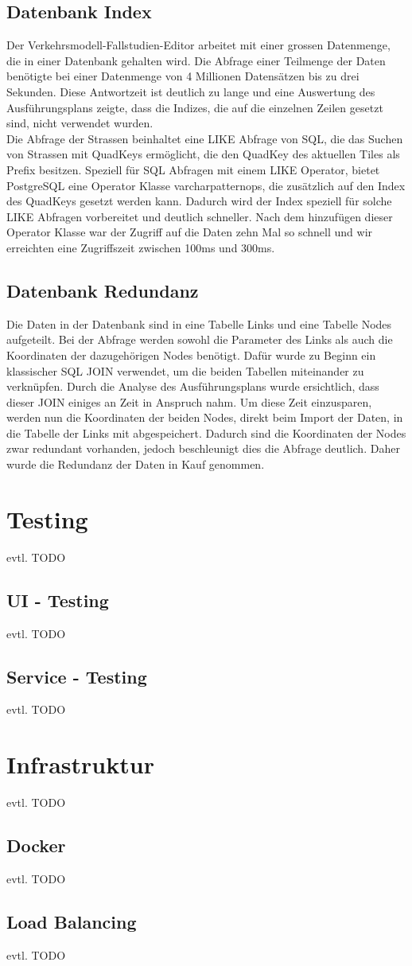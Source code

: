 \subsection{Datenbank Index}
Der Verkehrsmodell-Fallstudien-Editor arbeitet mit einer grossen Datenmenge, die in einer Datenbank gehalten wird. Die Abfrage einer Teilmenge der Daten benötigte bei einer Datenmenge von 4 Millionen Datensätzen bis zu drei Sekunden. Diese Antwortzeit ist deutlich zu lange und eine Auswertung des Ausführungsplans zeigte, dass die Indizes, die auf die einzelnen Zeilen gesetzt sind, nicht verwendet wurden.\\
Die Abfrage der Strassen beinhaltet eine LIKE Abfrage von SQL, die das Suchen von Strassen mit QuadKeys ermöglicht, die den QuadKey des aktuellen Tiles als Prefix besitzen. Speziell für SQL Abfragen mit einem LIKE Operator, bietet PostgreSQL eine Operator Klasse \glqq{}varchar\textunderscore pattern\textunderscore ops\grqq{}, die zusätzlich auf den Index des QuadKeys gesetzt werden kann. Dadurch wird der Index speziell für solche LIKE Abfragen vorbereitet und deutlich schneller. Nach dem hinzufügen dieser Operator Klasse war der Zugriff auf die Daten zehn Mal so schnell und wir erreichten eine Zugriffszeit zwischen 100ms und 300ms.
\subsection{Datenbank Redundanz} \label{ch:redundance}
Die Daten in der Datenbank sind in eine Tabelle \glqq{}Links\grqq{} und eine Tabelle \glqq{}Nodes\grqq{} aufgeteilt. Bei der Abfrage werden sowohl die Parameter des Links als auch die Koordinaten der dazugehörigen Nodes benötigt. Dafür wurde zu Beginn ein klassischer SQL JOIN verwendet, um die beiden Tabellen miteinander zu verknüpfen. Durch die Analyse des Ausführungsplans wurde ersichtlich, dass dieser JOIN einiges an Zeit in Anspruch nahm. Um diese Zeit einzusparen, werden nun die Koordinaten der beiden Nodes, direkt beim Import der Daten, in die Tabelle der Links mit abgespeichert. Dadurch sind die Koordinaten der Nodes zwar redundant vorhanden, jedoch beschleunigt dies die Abfrage deutlich. Daher wurde die Redundanz der Daten in Kauf genommen.
\newpage
\section{Testing}
evtl. TODO
\subsection{UI - Testing}
evtl. TODO
\subsection{Service - Testing}
evtl. TODO
\section{Infrastruktur}
evtl. TODO
\subsection{Docker}
evtl. TODO
\subsection{Load Balancing}
evtl. TODO